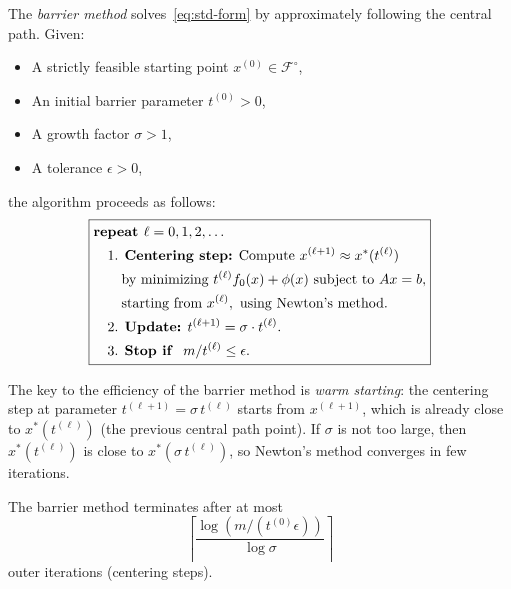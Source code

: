 \documentclass[11pt,a4paper]{article}
\begin{document}
\begin{definition}%
\label{def:barrier-method}
The \emph{barrier method} solves~\eqref{eq:std-form} by approximately
following the central path. Given:
\begin{itemize}
  \item A strictly feasible starting point $x^{(0)} \in \mathcal{F}^{\circ}$,
  \item An initial barrier parameter $t^{(0)} > 0$,
  \item A growth factor $\sigma > 1$,
  \item A tolerance $\epsilon > 0$,
\end{itemize}
the algorithm proceeds as follows:
\begin{equation}\label{eq:barrier-method}
\boxed{
\begin{aligned}
  &\textbf{repeat } \ell = 0, 1, 2, \dots \\
  &\quad \text{1. \textbf{Centering step:} Compute } x^{(\ell+1)}
    \approx x^*(t^{(\ell)}) \\
  &\quad\quad \text{by minimizing } t^{(\ell)} f_0(x) + \phi(x)
    \text{ subject to } Ax = b, \\
  &\quad\quad \text{starting from } x^{(\ell)}, \text{ using Newton's
    method.} \\
  &\quad \text{2. \textbf{Update:} } t^{(\ell+1)} = \sigma \cdot t^{(\ell)}. \\
  &\quad \text{3. \textbf{Stop if } } m / t^{(\ell)} \le \epsilon.
\end{aligned}
}
\end{equation}
\end{definition}

\begin{remark}\label{rem:warm-start}
The key to the efficiency of the barrier method is \emph{warm starting}:
the centering step at parameter $t^{(\ell+1)} = \sigma\,t^{(\ell)}$
starts from $x^{(\ell+1)}$, which is already close to $x^*(t^{(\ell)})$
(the previous central path point). If $\sigma$ is not too large, then
$x^*(t^{(\ell)})$ is close to $x^*(\sigma\,t^{(\ell)})$, so
Newton's method converges in few iterations.
\end{remark}

\begin{proposition}\label{prop:outer-iters}
The barrier method terminates after at most
\begin{equation}\label{eq:outer-iters}
  \left\lceil \frac{\log(m/(t^{(0)}\epsilon))}{\log\sigma}
  \right\rceil
\end{equation}
outer iterations (centering steps).
\end{proposition}
\end{document}

